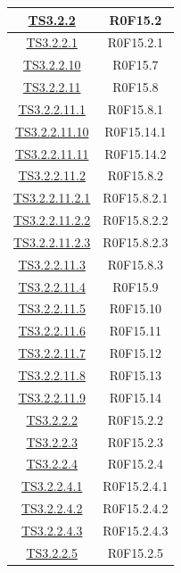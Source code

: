 \documentclass[../PianoDiQualifica.tex]{subfiles}
\begin{document}
\begin{longtable}{|c|c|}
		\hline
		\hyperlink{TS3.2.2}{TS3.2.2} & R0F15.2   \\
		\hline
		\hyperlink{TS3.2.2.1}{TS3.2.2.1} & R0F15.2.1   \\
		\hline
		\hyperlink{TS3.2.2.10}{TS3.2.2.10} & R0F15.7   \\
		\hline
		\hyperlink{TS3.2.2.11}{TS3.2.2.11} & R0F15.8   \\
		\hline
		\hyperlink{TS3.2.2.11.1}{TS3.2.2.11.1} & R0F15.8.1   \\
		\hline
		\hyperlink{TS3.2.2.11.10}{TS3.2.2.11.10} & R0F15.14.1   \\
		\hline
		\hyperlink{TS3.2.2.11.11}{TS3.2.2.11.11} & R0F15.14.2   \\
		\hline
		\hyperlink{TS3.2.2.11.2}{TS3.2.2.11.2} & R0F15.8.2   \\
		\hline
		\hyperlink{TS3.2.2.11.2.1}{TS3.2.2.11.2.1} & R0F15.8.2.1   \\
		\hline
		\hyperlink{TS3.2.2.11.2.2}{TS3.2.2.11.2.2} & R0F15.8.2.2   \\
		\hline
		\hyperlink{TS3.2.2.11.2.3}{TS3.2.2.11.2.3} & R0F15.8.2.3   \\
		\hline
		\hyperlink{TS3.2.2.11.3}{TS3.2.2.11.3} & R0F15.8.3   \\
		\hline
		\hyperlink{TS3.2.2.11.4}{TS3.2.2.11.4} & R0F15.9   \\
		\hline
		\hyperlink{TS3.2.2.11.5}{TS3.2.2.11.5} & R0F15.10   \\
		\hline
		\hyperlink{TS3.2.2.11.6}{TS3.2.2.11.6} & R0F15.11   \\
		\hline
		\hyperlink{TS3.2.2.11.7}{TS3.2.2.11.7} & R0F15.12   \\
		\hline
		\hyperlink{TS3.2.2.11.8}{TS3.2.2.11.8} & R0F15.13   \\
		\hline
		\hyperlink{TS3.2.2.11.9}{TS3.2.2.11.9} & R0F15.14   \\
		\hline
		\hyperlink{TS3.2.2.2}{TS3.2.2.2} & R0F15.2.2   \\
		\hline
		\hyperlink{TS3.2.2.3}{TS3.2.2.3} & R0F15.2.3   \\
		\hline
		\hyperlink{TS3.2.2.4}{TS3.2.2.4} & R0F15.2.4   \\
		\hline
		\hyperlink{TS3.2.2.4.1}{TS3.2.2.4.1} & R0F15.2.4.1   \\
		\hline
		\hyperlink{TS3.2.2.4.2}{TS3.2.2.4.2} & R0F15.2.4.2   \\
		\hline
		\hyperlink{TS3.2.2.4.3}{TS3.2.2.4.3} & R0F15.2.4.3   \\
		\hline
		\hyperlink{TS3.2.2.5}{TS3.2.2.5} & R0F15.2.5   \\

\end{longtable}
\end{document}
